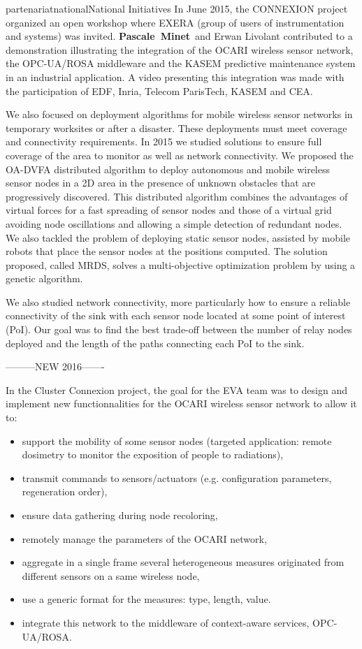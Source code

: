 \documentclass{ra2016}
\newcommand{\pascale} {\textbf{Pascale~Minet}}
\begin{document}
\begin{module}{partenariat}{national}{National Initiatives}
In June 2015, the CONNEXION project organized an open workshop where EXERA (group of users of instrumentation and systems) was invited.  \pascale~and Erwan Livolant contributed to a demonstration illustrating the integration of the OCARI wireless sensor network, the OPC-UA/ROSA middleware and the KASEM predictive maintenance system in an industrial application. A video presenting this integration was made with the participation of EDF, Inria, Telecom ParisTech, KASEM and CEA.

We also focused on deployment algorithms for mobile wireless sensor networks in temporary worksites or after a disaster. These deployments must meet coverage and connectivity requirements. In 2015 we studied solutions to ensure full coverage of the area to monitor as well as network connectivity. We proposed the OA-DVFA distributed algorithm to deploy autonomous and mobile wireless sensor nodes in a 2D area in the presence of unknown obstacles that are progressively discovered. This distributed algorithm combines the advantages of virtual forces for a fast spreading of sensor nodes and those of a virtual grid avoiding node oscillations and allowing a simple detection of redundant nodes. We also tackled the problem of deploying static sensor nodes, assisted by mobile robots that place the sensor nodes at the positions computed. The solution proposed, called MRDS, solves a multi-objective optimization problem by using a genetic algorithm.

We also studied network connectivity, more particularly how to ensure a reliable connectivity of the sink with each sensor node located at some point of interest (PoI). Our goal was to find the best trade-off between the number of relay nodes deployed and the length of the paths connecting each PoI to the sink.

---------NEW 2016-------


In the Cluster Connexion project, the goal for the EVA team was to design and implement new functionnalities for the OCARI wireless sensor network to allow it to:
\begin{itemize}
\item	support the mobility of some sensor nodes (targeted application: remote dosimetry to monitor the exposition of people to radiations), 
\item	transmit commands to sensors/actuators (e.g. configuration parameters, regeneration order),
\item	ensure data gathering during node recoloring,  
\item	remotely manage the parameters of the OCARI network,
\item	aggregate in a single frame several heterogeneous measures originated from different sensors on a same wireless node, 
\item	use a generic format for the measures: type, length, value.
\item integrate this network to the middleware of context-aware services, OPC-UA/ROSA. 
\end{itemize}


\end{module}
\end{document}
